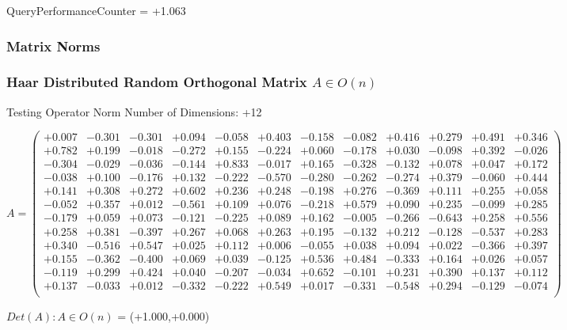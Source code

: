\documentclass[9pt]{article}
\theoremstyle{plain}
\theoremstyle{definition}
\theoremstyle{remark}
\numberwithin{equation}{section}
\begin{document}
QueryPerformanceCounter  =  +1.063
\subsubsection{Matrix Norms}
\subsubsection{Haar Distributed Random Orthogonal Matrix $A \in O(n)$}
 Testing Operator Norm
Number of Dimensions: +12

$A = \left(
\begin{array}{
cccccccccccc}
+0.007 & -0.301 & -0.301 & +0.094 & -0.058 & +0.403 & -0.158 & -0.082 & +0.416 & +0.279 & +0.491 & +0.346 \\
+0.782 & +0.199 & -0.018 & -0.272 & +0.155 & -0.224 & +0.060 & -0.178 & +0.030 & -0.098 & +0.392 & -0.026 \\
-0.304 & -0.029 & -0.036 & -0.144 & +0.833 & -0.017 & +0.165 & -0.328 & -0.132 & +0.078 & +0.047 & +0.172 \\
-0.038 & +0.100 & -0.176 & +0.132 & -0.222 & -0.570 & -0.280 & -0.262 & -0.274 & +0.379 & -0.060 & +0.444 \\
+0.141 & +0.308 & +0.272 & +0.602 & +0.236 & +0.248 & -0.198 & +0.276 & -0.369 & +0.111 & +0.255 & +0.058 \\
-0.052 & +0.357 & +0.012 & -0.561 & +0.109 & +0.076 & -0.218 & +0.579 & +0.090 & +0.235 & -0.099 & +0.285 \\
-0.179 & +0.059 & +0.073 & -0.121 & -0.225 & +0.089 & +0.162 & -0.005 & -0.266 & -0.643 & +0.258 & +0.556 \\
+0.258 & +0.381 & -0.397 & +0.267 & +0.068 & +0.263 & +0.195 & -0.132 & +0.212 & -0.128 & -0.537 & +0.283 \\
+0.340 & -0.516 & +0.547 & +0.025 & +0.112 & +0.006 & -0.055 & +0.038 & +0.094 & +0.022 & -0.366 & +0.397 \\
+0.155 & -0.362 & -0.400 & +0.069 & +0.039 & -0.125 & +0.536 & +0.484 & -0.333 & +0.164 & +0.026 & +0.057 \\
-0.119 & +0.299 & +0.424 & +0.040 & -0.207 & -0.034 & +0.652 & -0.101 & +0.231 & +0.390 & +0.137 & +0.112 \\
+0.137 & -0.033 & +0.012 & -0.332 & -0.222 & +0.549 & +0.017 & -0.331 & -0.548 & +0.294 & -0.129 & -0.074 \\
\end{array}
\right)$ \newline 

$Det(A) :   A \in O(n)$ = (+1.000,+0.000)
\end{document}
